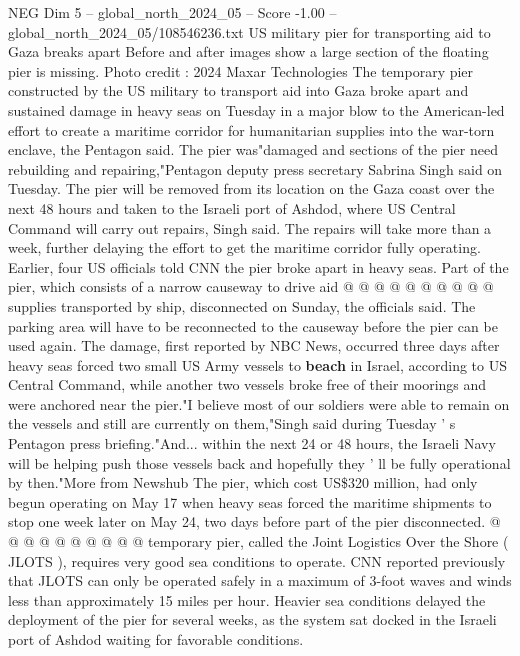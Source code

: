 \begin{textsample}{NEG Dim 5 – global\_north\_2024\_05 – Score -1.00 – global\_north\_2024\_05/108546236.txt}  \label{ex:f5_neg_288}
US military pier for transporting aid to Gaza breaks apart Before and after images show a large section of the floating pier is missing.
Photo credit : 2024 Maxar Technologies The temporary pier constructed by the US military to transport aid into Gaza broke apart and sustained damage in heavy seas on Tuesday in a major blow to the American-led effort to create a maritime corridor for humanitarian supplies into the war-torn enclave, the Pentagon said.
The pier was"damaged and sections of the pier need rebuilding and repairing,"Pentagon deputy press secretary Sabrina Singh said on Tuesday.
The pier will be removed from its location on the Gaza coast over the next 48 hours and taken to the Israeli port of Ashdod, where US Central Command will carry out repairs, Singh said.
The repairs will take more than a week, further delaying the effort to get the maritime corridor fully operating.
Earlier, four US officials told CNN the pier broke apart in heavy seas.
Part of the pier, which consists of a narrow causeway to drive aid @ @ @ @ @ @ @ @ @ @ supplies transported by ship, disconnected on Sunday, the officials said.
The parking area will have to be reconnected to the causeway before the pier can be used again.
The damage, first reported by NBC News, occurred three days after heavy seas forced two small US Army vessels to \textbf{beach} in Israel, according to US Central Command, while another two vessels broke free of their moorings and were anchored near the pier."I believe most of our soldiers were able to remain on the vessels and still are currently on them,"Singh said during Tuesday ' s Pentagon press briefing."And... within the next 24 or 48 hours, the Israeli Navy will be helping push those vessels back and hopefully they ' ll be fully operational by then."More from Newshub The pier, which cost US\$320 million, had only begun operating on May 17 when heavy seas forced the maritime shipments to stop one week later on May 24, two days before part of the pier disconnected. @ @ @ @ @ @ @ @ @ @ temporary pier, called the Joint Logistics Over the Shore ( JLOTS ), requires very good sea conditions to operate.
CNN reported previously that JLOTS can only be operated safely in a maximum of 3-foot waves and winds less than approximately 15 miles per hour.
Heavier sea conditions delayed the deployment of the pier for several weeks, as the system sat docked in the Israeli port of Ashdod waiting for favorable conditions.

\end{textsample}
